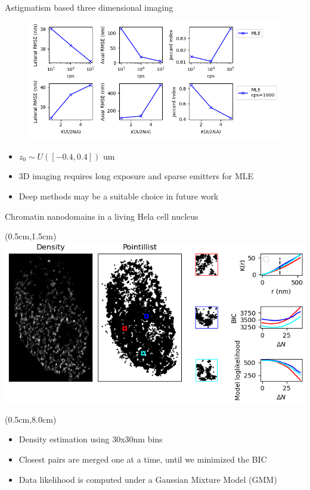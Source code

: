 \documentclass{beamer}					%
\begin{document}
\begin{frame}{Astigmatism based three dimensional imaging}
\begin{figure}
\includegraphics[width=13cm]{PSF3D.png}
\end{figure}
\begin{itemize}
\item $z_{0}\sim U([-0.4,0.4])$ um
\item 3D imaging requires long exposure and sparse emitters for MLE
\item Deep methods may be a suitable choice in future work
\end{itemize}
\end{frame}


\begin{frame}{Chromatin nanodomains in a living Hela cell nucleus}

\begin{textblock*}{13cm}(0.5cm,1.5cm)
\includegraphics[width=\textwidth]{Cluster.png}
\end{textblock*}

\begin{textblock*}{13cm}(0.5cm,8.0cm)
\begin{itemize}
\item Density estimation using 30x30nm bins
\item Closest pairs are merged one at a time, until we minimized the BIC
\item Data likelihood is computed under a Gaussian Mixture Model (GMM)
\end{itemize}
\end{textblock*}

\end{frame}
\end{document}
